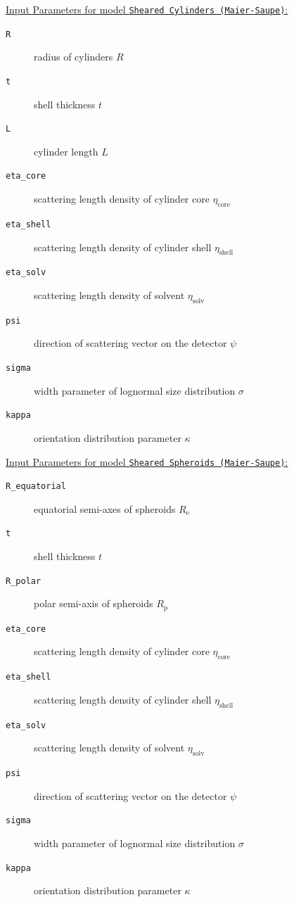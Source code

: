 \vspace{5mm}

\uline{Input Parameters for model \texttt{Sheared Cylinders (Maier-Saupe)}:}\\
\begin{description}
\item[\texttt{R}] radius of cylinders $R$
\item[\texttt{t}] shell thickness $t$
\item[\texttt{L}] cylinder length $L$
\item[\texttt{eta\_core}] scattering length density of cylinder core $\eta_\mathrm{core}$
\item[\texttt{eta\_shell}] scattering length density of cylinder shell $\eta_\mathrm{shell}$
\item[\texttt{eta\_solv}] scattering length density of solvent $\eta_\mathrm{solv}$
\item[\texttt{psi}] direction of scattering vector on the detector $\psi$
\item[{\texttt{sigma}}] width parameter of lognormal size distribution $\sigma$
\item[{\texttt{kappa}}] orientation distribution parameter $\kappa$
\end{description}

\vspace{5mm}

\uline{Input Parameters for model \texttt{Sheared Spheroids (Maier-Saupe)}:}\\
\begin{description}
\item[\texttt{R\_equatorial}] equatorial semi-axes of spheroids $R_\mathrm{e}$
\item[\texttt{t}] shell thickness $t$
\item[\texttt{R\_polar}] polar semi-axis of spheroids $R_\mathrm{p}$
\item[\texttt{eta\_core}] scattering length density of cylinder core $\eta_\mathrm{core}$
\item[\texttt{eta\_shell}] scattering length density of cylinder shell $\eta_\mathrm{shell}$
\item[\texttt{eta\_solv}] scattering length density of solvent $\eta_\mathrm{solv}$
\item[\texttt{psi}] direction of scattering vector on the detector $\psi$
\item[{\texttt{sigma}}] width parameter of lognormal size distribution $\sigma$
\item[{\texttt{kappa}}] orientation distribution parameter $\kappa$
\end{description}

